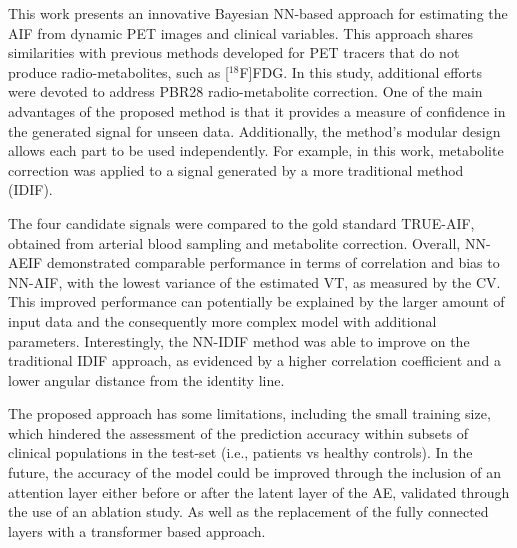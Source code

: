        This work presents an innovative Bayesian \gls{NN}-based approach for estimating the \gls{AIF} from dynamic \gls{PET} images and clinical variables. This approach shares similarities with previous methods developed for \gls{PET} tracers that do not produce radio-metabolites, such as [$^{18}$F]\gls{FDG}. In this study, additional efforts were devoted to address \gls{PBR28} radio-metabolite correction. One of the main advantages of the proposed method is that it provides a measure of confidence in the generated signal for unseen data. Additionally, the method's modular design allows each part to be used independently. For example, in this work, metabolite correction was applied to a signal generated by a more traditional method (\gls{IDIF}). 
        
        The four candidate signals were compared to the gold standard TRUE-\gls{AIF}, obtained from arterial blood sampling and metabolite correction. Overall, \gls{NN}-\gls{AE}\gls{IF} demonstrated comparable performance in terms of correlation and bias to \gls{NN}-\gls{AIF}, with the lowest variance of the estimated \gls{VT}, as measured by the \gls{CV}. This improved performance can potentially be explained by the larger amount of input data and the consequently more complex model with additional parameters. Interestingly, the \gls{NN}-\gls{IDIF} method was able to improve on the traditional \gls{IDIF} approach, as evidenced by a higher correlation coefficient and a lower angular distance from the identity line.
        
        The proposed approach has some limitations, including the small training size, which hindered the assessment of the prediction accuracy within subsets of clinical populations in the test-set (i.e., patients vs healthy controls). In the future, the accuracy of the model could be improved through the inclusion of an attention layer either before or after the latent layer of the \gls{AE}, validated through the use of an ablation study. As well as the replacement of the fully connected layers with a transformer based approach.
    